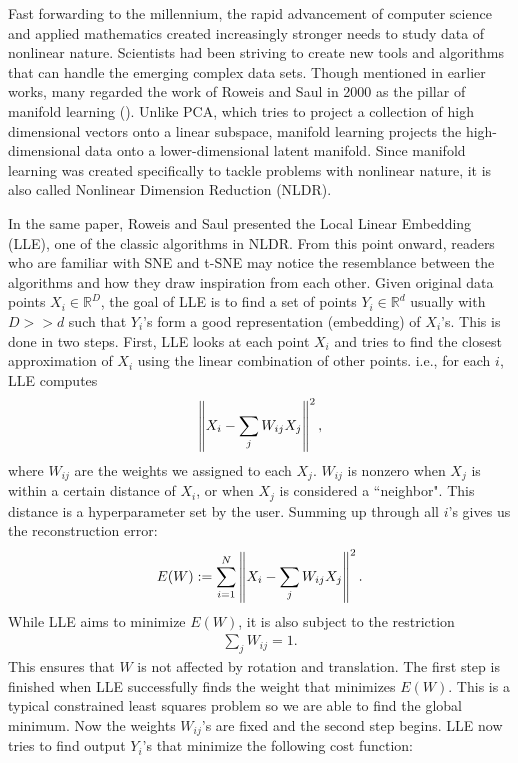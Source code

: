 Fast forwarding to the millennium, the rapid advancement of computer science
and applied mathematics created increasingly stronger needs to study data of
nonlinear nature. Scientists had been striving to create new tools and
algorithms that can handle the emerging complex data sets. Though mentioned in
earlier works, many regarded the work of Roweis and Saul in 2000 as the pillar
of manifold learning (\cite{Roweis2000}). Unlike PCA, which tries to project a
collection of high dimensional vectors onto a linear subspace, manifold
learning projects the high-dimensional data onto a lower-dimensional latent
manifold. Since manifold learning was created specifically to tackle problems
with nonlinear nature, it is also called Nonlinear Dimension Reduction (NLDR).

In the same paper, Roweis and Saul presented the Local Linear Embedding (LLE),
one of the classic algorithms in NLDR. From this point onward, readers who are
familiar with SNE and t-SNE may notice the resemblance between the algorithms
and how they draw inspiration from each other. Given original data points $X_i
    \in \mathbb{R}^D$, the goal of LLE is to find a set of points $Y_i \in
    \mathbb{R}^d$ usually with $D >> d$ such that $Y_i$'s form a good
representation (embedding) of $X_i$'s. This is done in two steps. First, LLE
looks at each point $X_i$ and tries to find the closest approximation of $X_i$
using the linear combination of other points. i.e., for each $i$, LLE computes
\begin{align}
    \left\lVert X_i - \sum_{j} W_{ij}X_j\right\rVert^2,
\end{align}
where $W_{ij}$ are the weights we assigned to each $X_j$. $W_{ij}$ is nonzero when $X_j$ is within a certain distance of $X_i$, or when $X_j$ is considered a ``neighbor". This distance is a hyperparameter set by the user. Summing up through all $i$'s gives us the reconstruction error:
\begin{align}
    E(W) := \sum_{i=1}^N \left\lVert X_i - \sum_{j} W_{ij}X_j\right\rVert^2.
\end{align}
While LLE aims to minimize $E(W)$, it is also subject to the restriction
\begin{align}
    \sum_{j} W_{ij} = 1.
\end{align}
This ensures that $W$ is not affected by rotation and translation. The first step is finished when LLE successfully finds the weight that minimizes $E(W)$. This is a typical constrained least squares problem so we are able to find the global minimum. Now the weights $W_{ij}$'s are fixed and the second step begins. LLE now tries to find output $Y_i$'s that minimize the following cost function:
